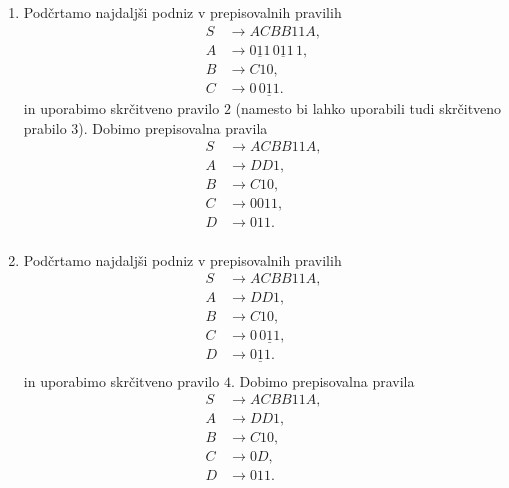\documentclass[fin1, tisk]{fmfdelo}
\theoremstyle{definition}
\begin{document}
\begin{primer}
\begin{enumerate}
        \item Podčrtamo najdaljši podniz v prepisovalnih pravilih
        \begin{align*}
            S &\rightarrow ACBB11A, \\
            A &\rightarrow \underline{011} \, \underline{011} \, 1, \\
            B &\rightarrow C10, \\
            C &\rightarrow 0 \, \underline{011}.
        \end{align*}
        in uporabimo skrčitveno pravilo $2$ (namesto bi lahko uporabili tudi skrčitveno prabilo $3$).
        Dobimo prepisovalna pravila
        \begin{align*}
            S &\rightarrow ACBB11A, \\
            A &\rightarrow DD1, \\
            B &\rightarrow C10, \\
            C &\rightarrow 0011, \\
            D &\rightarrow 011. \\
        \end{align*}

        \item Podčrtamo najdaljši podniz v prepisovalnih pravilih
        \begin{align*}
            S &\rightarrow ACBB11A, \\
            A &\rightarrow DD1, \\
            B &\rightarrow C10, \\
            C &\rightarrow 0 \, \underline{011}, \\
            D &\rightarrow \underline{011}. \\
        \end{align*}
        in uporabimo skrčitveno pravilo $4$. Dobimo prepisovalna pravila
        \begin{align*}
            S &\rightarrow ACBB11A, \\
            A &\rightarrow DD1, \\
            B &\rightarrow C10, \\
            C &\rightarrow 0D, \\
            D &\rightarrow 011. \\
        \end{align*}


\end{enumerate}
\end{primer}
\end{document}
